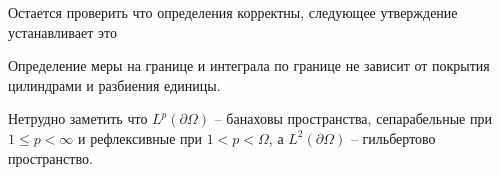 \documentclass[12pt,a4paper]{article}
\begin{document}
Остается проверить что определения корректны, следующее утверждение устанавливает это
\begin{proposition}{}{}
	Определение меры на границе и интеграла по границе не зависит от покрытия цилиндрами и разбиения единицы.
\end{proposition}
Нетрудно заметить что $L^p (\partial \Omega)$ -- банаховы пространства, сепарабельные при $1 \leq p < \infty$ и рефлексивные при $1 < p < \Omega$, а $L^2 (\partial \Omega)$ -- гильбертово пространство.
\newpage

\end{document}
